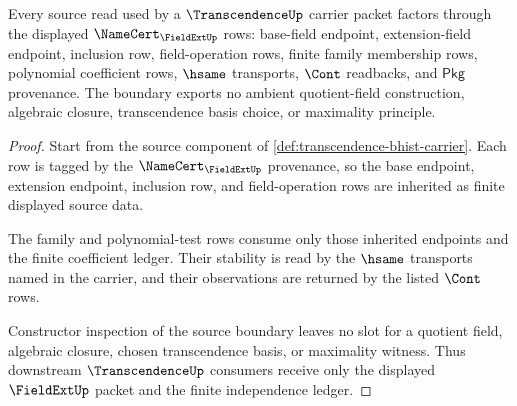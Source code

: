 \begin{theorem}\label{thm:transcendence-fieldext-source-boundary}
Every source read used by a $\TranscendenceUp$ carrier packet factors through
the displayed $\NameCert_{\FieldExtUp}$ rows: base-field endpoint,
extension-field endpoint, inclusion row, field-operation rows, finite family
membership rows, polynomial coefficient rows, $\hsame$ transports, $\Cont$
readbacks, and $\mathsf{Pkg}$ provenance. The boundary exports no ambient
quotient-field construction, algebraic closure, transcendence basis choice, or
maximality principle.
\end{theorem}
\begin{proof}
Start from the source component of
\autoref{def:transcendence-bhist-carrier}. Each row is tagged by the
$\NameCert_{\FieldExtUp}$ provenance, so the base endpoint, extension endpoint,
inclusion row, and field-operation rows are inherited as finite displayed
source data.

The family and polynomial-test rows consume only those inherited endpoints and
the finite coefficient ledger. Their stability is read by the $\hsame$
transports named in the carrier, and their observations are returned by the
listed $\Cont$ rows.

Constructor inspection of the source boundary leaves no slot for a quotient
field, algebraic closure, chosen transcendence basis, or maximality witness.
Thus downstream $\TranscendenceUp$ consumers receive only the displayed
$\FieldExtUp$ packet and the finite independence ledger.
\end{proof}

